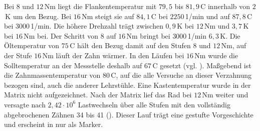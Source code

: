 Bei $8$ und $12$\,Nm liegt die Flankentemperatur mit $79{,}5$ bis $81{,}9$\,\textdegree C innerhalb von $2$\,K um den Bezug. Bei $16$\,Nm steigt sie auf $84{,}1$\,\textdegree C bei $2250$\,1/min und auf $87{,}8$\,\textdegree C bei $3000$\,1/min. Die höhere Drehzahl trägt zwischen $0{,}9$\,K bei $12$\,Nm und $3{,}7$\,K bei $16$\,Nm bei. Der Schritt von $8$ auf $16$\,Nm bringt bei $3000$\,1/min $6{,}3$\,K. Die Öltemperatur von $75$\,\textdegree C hält den Bezug damit auf den Stufen $8$ und $12$\,Nm, auf der Stufe $16$\,Nm läuft der Zahn wärmer. In den Läufen bei $16$\,Nm wurde die Solltemperatur an der Messstelle deshalb auf $67$\,\textdegree C gesetzt (vgl. ). Maßgebend ist die Zahnmassentemperatur von $80$\,\textdegree C, auf die alle Versuche an dieser Verzahnung bezogen sind, auch die anderer Lehrstühle. Eine Kastentemperatur wurde in der Matrix nicht aufgezeichnet. Nach der Matrix lief das Rad bei $12$\,Nm weiter und versagte nach $2{,}42 \cdot 10^{6}$ Lastwechseln über alle Stufen mit den vollständig abgebrochenen Zähnen 34 bis 41 (). Dieser Lauf trägt eine gestufte Vorgeschichte und erscheint in  nur als Marker.

